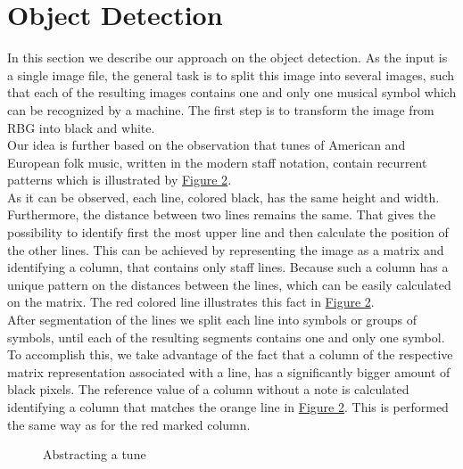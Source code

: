 \documentclass[twocolumn]{article}
\begin{document}
\section{Object Detection}
In this section we describe our approach on the object detection. As the input is a single image file, the general task is to split this image into several images, such that each of the resulting images contains one and only one musical symbol which can be recognized by a machine. The first step is to transform the image from RBG into black and white. \\
Our idea is further based on the observation that tunes of American and European folk music, written in the modern staff notation, contain recurrent patterns which is illustrated by \hyperref[object_detection]{Figure 2}. \\
As it can be observed, each line, colored black, has the same height and width. Furthermore, the distance between two lines remains the same. That gives the possibility to identify first the most upper line and then calculate the position of the other lines. This can be achieved by representing the image as a matrix and identifying a column, that contains only staff lines. Because such a column has a unique pattern on the distances between the lines, which can be easily calculated on the matrix. The red colored line illustrates this fact in \hyperref[object_detection]{Figure 2}. \\
After segmentation of the lines we split each line into symbols or groups of symbols, until each of the resulting segments contains one and only one symbol. To accomplish this, we take advantage of the fact that a column of the respective matrix representation associated with a line, has a significantly bigger amount of black pixels. The reference value of a column without a note is calculated identifying a column that matches the orange line in  \hyperref[object_detection]{Figure 2}. This is performed the same way as for the red marked column. 

\begin{figure}
 
 \caption{Abstracting a tune} 
 \label{object_detection}
\end{figure}
\end{document}
